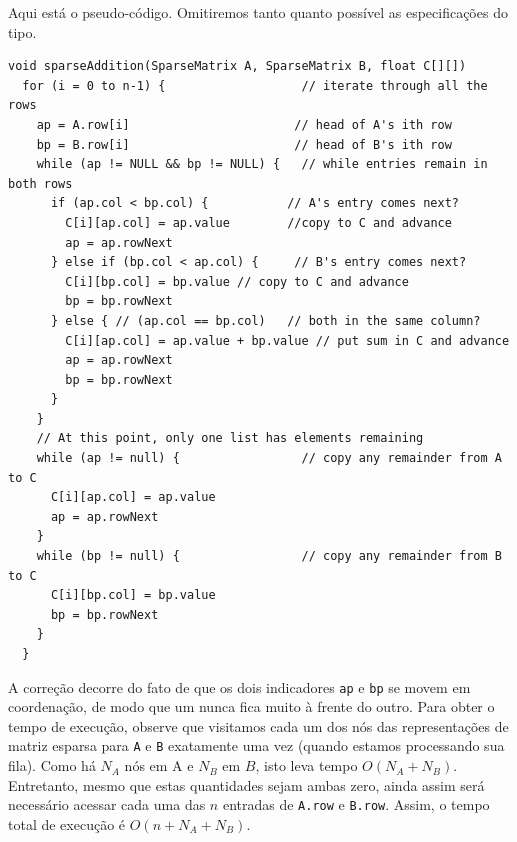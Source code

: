 \documentclass{article}
\begin{document}
Aqui está o pseudo-código. Omitiremos tanto quanto possível as especificações do tipo.

\begin{lstlisting}
void sparseAddition(SparseMatrix A, SparseMatrix B, float C[][])
  for (i = 0 to n-1) {                   // iterate through all the rows
    ap = A.row[i]                       // head of A's ith row
    bp = B.row[i]                       // head of B's ith row
    while (ap != NULL && bp != NULL) {   // while entries remain in both rows
      if (ap.col < bp.col) {           // A's entry comes next?
        C[i][ap.col] = ap.value        //copy to C and advance
        ap = ap.rowNext
      } else if (bp.col < ap.col) {     // B's entry comes next?
        C[i][bp.col] = bp.value // copy to C and advance
        bp = bp.rowNext
      } else { // (ap.col == bp.col)   // both in the same column?
        C[i][ap.col] = ap.value + bp.value // put sum in C and advance
        ap = ap.rowNext
        bp = bp.rowNext
      }
    }
    // At this point, only one list has elements remaining
    while (ap != null) {                 // copy any remainder from A to C
      C[i][ap.col] = ap.value
      ap = ap.rowNext
    }
    while (bp != null) {                 // copy any remainder from B to C
      C[i][bp.col] = bp.value
      bp = bp.rowNext
    }
  }
\end{lstlisting}

A correção decorre do fato de que os dois indicadores \texttt{ap} e \texttt{bp} se movem em coordenação, de modo que um nunca fica muito à frente do outro. Para obter o tempo de execução, observe que visitamos cada um dos nós das representações de matriz esparsa para \texttt{A} e \texttt{B} exatamente uma vez (quando estamos processando sua fila). Como há $N_A$ nós em A e $N_B$ em $B$, isto leva tempo $O(N_A + N_B)$. Entretanto, mesmo que estas quantidades sejam ambas zero, ainda assim será necessário acessar cada uma das $n$ entradas de \texttt{A.row} e \texttt{B.row}. Assim, o tempo total de execução é $O(n+ N_A + N_B)$.
\end{document}
